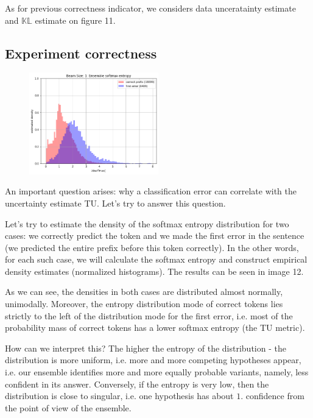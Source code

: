 \documentclass[a4paper,14pt]{extarticle}
\begin{document}
	As for previous correctness indicator, we considers data unceratainty estimate and $\mathbb{KL}$ estimate on figure 11.
	
\subsection{Experiment correctness}
	\begin{figure}
		\includegraphics[width=0.5\textwidth]{images/ens_entropy.png}
	\end{figure}
	
	An important question arises: why a classification error can correlate with the uncertainty estimate TU. Let's try to answer this question.
	
	Let's try to estimate the density of the softmax entropy distribution for two cases: we correctly predict the token and we made the first error in the sentence (we predicted the entire prefix before this token correctly). In the other words, for each such case, we will calculate the softmax entropy and construct empirical density estimates (normalized histograms). The results can be seen in image 12.

	As we can see, the densities in both cases are distributed almost normally, unimodally. Moreover, the entropy distribution mode of correct tokens lies strictly to the left of the distribution mode for the first error, i.e. most of the probability mass of correct tokens has a lower softmax entropy (the TU metric).

	How can we interpret this? The higher the entropy of the distribution - the distribution is more uniform, i.e. more and more competing hypotheses appear, i.e. our ensemble identifies more and more equally probable variants, namely, less confident in its answer. Conversely, if the entropy is very low, then the distribution is close to singular, i.e. one hypothesis has about $1.$ confidence from the point of view of the ensemble.
\end{document}

